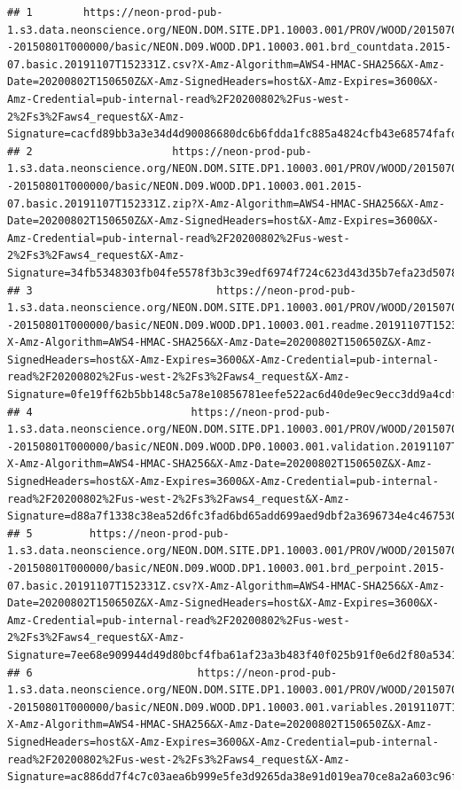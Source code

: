 \documentclass[]{book}
\begin{document}
\begin{verbatim}
## 1        https://neon-prod-pub-1.s3.data.neonscience.org/NEON.DOM.SITE.DP1.10003.001/PROV/WOOD/20150701T000000--20150801T000000/basic/NEON.D09.WOOD.DP1.10003.001.brd_countdata.2015-07.basic.20191107T152331Z.csv?X-Amz-Algorithm=AWS4-HMAC-SHA256&X-Amz-Date=20200802T150650Z&X-Amz-SignedHeaders=host&X-Amz-Expires=3600&X-Amz-Credential=pub-internal-read%2F20200802%2Fus-west-2%2Fs3%2Faws4_request&X-Amz-Signature=cacfd89bb3a3e34d4d90086680dc6b6fdda1fc885a4824cfb43e68574fafdec5
## 2                      https://neon-prod-pub-1.s3.data.neonscience.org/NEON.DOM.SITE.DP1.10003.001/PROV/WOOD/20150701T000000--20150801T000000/basic/NEON.D09.WOOD.DP1.10003.001.2015-07.basic.20191107T152331Z.zip?X-Amz-Algorithm=AWS4-HMAC-SHA256&X-Amz-Date=20200802T150650Z&X-Amz-SignedHeaders=host&X-Amz-Expires=3600&X-Amz-Credential=pub-internal-read%2F20200802%2Fus-west-2%2Fs3%2Faws4_request&X-Amz-Signature=34fb5348303fb04fe5578f3b3c39edf6974f724c623d43d35b7efa23d5078289
## 3                             https://neon-prod-pub-1.s3.data.neonscience.org/NEON.DOM.SITE.DP1.10003.001/PROV/WOOD/20150701T000000--20150801T000000/basic/NEON.D09.WOOD.DP1.10003.001.readme.20191107T152331Z.txt?X-Amz-Algorithm=AWS4-HMAC-SHA256&X-Amz-Date=20200802T150650Z&X-Amz-SignedHeaders=host&X-Amz-Expires=3600&X-Amz-Credential=pub-internal-read%2F20200802%2Fus-west-2%2Fs3%2Faws4_request&X-Amz-Signature=0fe19ff62b5bb148c5a78e10856781eefe522ac6d40de9ec9ecc3dd9a4cdf12d
## 4                         https://neon-prod-pub-1.s3.data.neonscience.org/NEON.DOM.SITE.DP1.10003.001/PROV/WOOD/20150701T000000--20150801T000000/basic/NEON.D09.WOOD.DP0.10003.001.validation.20191107T152331Z.csv?X-Amz-Algorithm=AWS4-HMAC-SHA256&X-Amz-Date=20200802T150650Z&X-Amz-SignedHeaders=host&X-Amz-Expires=3600&X-Amz-Credential=pub-internal-read%2F20200802%2Fus-west-2%2Fs3%2Faws4_request&X-Amz-Signature=d88a7f1338c38ea52d6fc3fad6bd65add699aed9dbf2a3696734e4c4675303c1
## 5         https://neon-prod-pub-1.s3.data.neonscience.org/NEON.DOM.SITE.DP1.10003.001/PROV/WOOD/20150701T000000--20150801T000000/basic/NEON.D09.WOOD.DP1.10003.001.brd_perpoint.2015-07.basic.20191107T152331Z.csv?X-Amz-Algorithm=AWS4-HMAC-SHA256&X-Amz-Date=20200802T150650Z&X-Amz-SignedHeaders=host&X-Amz-Expires=3600&X-Amz-Credential=pub-internal-read%2F20200802%2Fus-west-2%2Fs3%2Faws4_request&X-Amz-Signature=7ee68e909944d49d80bcf4fba61af23a3b483f40f025b91f0e6d2f80a5341235
## 6                          https://neon-prod-pub-1.s3.data.neonscience.org/NEON.DOM.SITE.DP1.10003.001/PROV/WOOD/20150701T000000--20150801T000000/basic/NEON.D09.WOOD.DP1.10003.001.variables.20191107T152331Z.csv?X-Amz-Algorithm=AWS4-HMAC-SHA256&X-Amz-Date=20200802T150650Z&X-Amz-SignedHeaders=host&X-Amz-Expires=3600&X-Amz-Credential=pub-internal-read%2F20200802%2Fus-west-2%2Fs3%2Faws4_request&X-Amz-Signature=ac886dd7f4c7c03aea6b999e5fe3d9265da38e91d019ea70ce8a2a603c96fab5

\end{verbatim}
\end{document}
